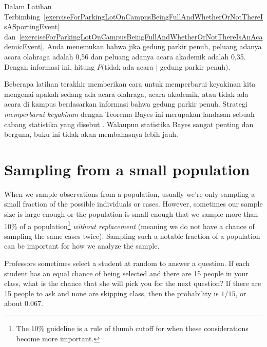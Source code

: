 \begin{exercisewrap}
\begin{nexercise} \label{exerciseForParkingLotOnCampusBeingFullAndWhetherOrNotThereIsNoEvent}
Dalam Latihan Terbimbing~\ref{exerciseForParkingLotOnCampusBeingFullAndWhetherOrNotThereIsASportingEvent} dan~\ref{exerciseForParkingLotOnCampusBeingFullAndWhetherOrNotThereIsAnAcademicEvent}, Anda menemukan bahwa jika gedung parkir penuh, peluang adanya acara olahraga adalah 0,56 dan peluang adanya acara akademik adalah 0,35. Dengan informasi ini, hitung $P($tidak ada acara $|$ gedung parkir penuh$)$.\footnotemark
\end{nexercise}
\end{exercisewrap}

Beberapa latihan terakhir memberikan cara untuk memperbarui keyakinan kita mengenai apakah sedang ada acara olahraga, acara akademik, atau tidak ada acara di kampus berdasarkan informasi bahwa gedung parkir penuh. Strategi \emph{memperbarui keyakinan} dengan Teorema Bayes ini merupakan landasan sebuah cabang statistika yang disebut . Walaupun statistika Bayes sangat penting dan berguna, buku ini tidak akan membahasnya lebih jauh.



{}

\section{Sampling from a small population}
\label{smallPop}

\noindent%
When we sample observations from a population,
usually we're only sampling a small fraction of
the possible individuals or cases.
However, sometimes our sample size is large enough
or the population is small enough that we
sample more than 10\% of a population\footnote{The 10\%
  guideline is a rule of thumb cutoff for when these
  considerations become more important.}
\emph{without
replacement} (meaning we do not have a chance of
sampling the same cases twice).
Sampling such a notable fraction of a population
can be important for how we analyze the
sample.

\begin{examplewrap}
\begin{nexample}{Professors sometimes select a student at random to answer a question. If each student has an equal chance of being selected and there are 15 people in your class, what is the chance that she will pick you for the next question?}
If there are 15 people to ask and none are skipping class, then the probability is $1/15$, or about $0.067$.
\end{nexample}
\end{examplewrap}

